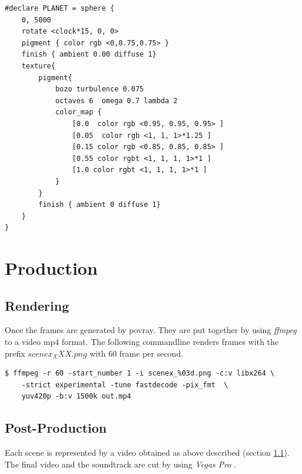 \begin{lstlisting}
#declare PLANET = sphere {
	0, 5000
	rotate <clock*15, 0, 0>
	pigment { color rgb <0,0.75,0.75> }
	finish { ambient 0.00 diffuse 1}
	texture{
		pigment{
			bozo turbulence 0.075
			octaves 6  omega 0.7 lambda 2
			color_map {
				[0.0  color rgb <0.95, 0.95, 0.95> ]
				[0.05  color rgb <1, 1, 1>*1.25 ]
				[0.15 color rgb <0.85, 0.85, 0.85> ]
				[0.55 color rgbt <1, 1, 1, 1>*1 ]
				[1.0 color rgbt <1, 1, 1, 1>*1 ]
			}
		}
		finish { ambient 0 diffuse 1}
	}
}
\end{lstlisting}

\chapter{Production}

\section{Rendering} \label{rendering}
Once the frames are generated by povray. They are put together by using \textit{ffmpeg} to a video mp4 format. The following commandline renders frames with the prefix $scenex_XXX.png$ with 60 frame per second.

\begin{lstlisting}
$ ffmpeg -r 60 -start_number 1 -i scenex_%03d.png -c:v libx264 \
	-strict experimental -tune fastdecode -pix_fmt  \
	yuv420p -b:v 1500k out.mp4

\end{lstlisting}

\section{Post-Production}
Each scene is represented by a video obtained as above described (section \ref{rendering}). The final video and the soundtrack are cut by using \textit{Vegas Pro} \cite{VegasPro}.
